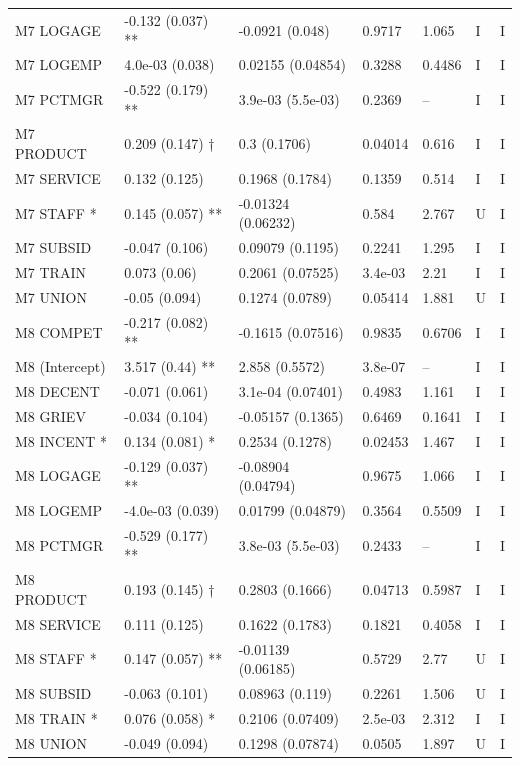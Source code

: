 {\begin{longtable}{@{}p{.245\linewidth}p{.17\linewidth}p{.17\linewidth}p{.085\linewidth}p{.060\linewidth}p{.08\linewidth}p{.07\linewidth}@{}}
M7 LOGAGE & -0.132 (0.037) ** & -0.0921 (0.048) & 0.9717 & 1.065 & I & I\\
M7 LOGEMP & 4.0e-03 (0.038) & 0.02155 (0.04854) & 0.3288 & 0.4486 & I & I\\
M7 PCTMGR & -0.522 (0.179) ** & 3.9e-03 (5.5e-03) & 0.2369 & -- & I & I\\
M7 PRODUCT & 0.209 (0.147) † & 0.3 (0.1706) & 0.04014 & 0.616 & I & I\\
M7 SERVICE & 0.132 (0.125) & 0.1968 (0.1784) & 0.1359 & 0.514 & I & I\\
M7 STAFF * & 0.145 (0.057) ** & -0.01324 (0.06232) & 0.584 & 2.767 & U & I\\
M7 SUBSID & -0.047 (0.106) & 0.09079 (0.1195) & 0.2241 & 1.295 & I & I\\
M7 TRAIN & 0.073 (0.06) & 0.2061 (0.07525) & 3.4e-03 & 2.21 & I & I\\
M7 UNION & -0.05 (0.094) & 0.1274 (0.0789) & 0.05414 & 1.881 & U & I\\
M8 COMPET & -0.217 (0.082) ** & -0.1615 (0.07516) & 0.9835 & 0.6706 & I & I\\
M8 (Intercept) & 3.517 (0.44) ** & 2.858 (0.5572) & 3.8e-07 & -- & I & I\\
M8 DECENT & -0.071 (0.061) & 3.1e-04 (0.07401) & 0.4983 & 1.161 & I & I\\
M8 GRIEV & -0.034 (0.104) & -0.05157 (0.1365) & 0.6469 & 0.1641 & I & I\\
M8 INCENT * & 0.134 (0.081) * & 0.2534 (0.1278) & 0.02453 & 1.467 & I & I\\
M8 LOGAGE & -0.129 (0.037) ** & -0.08904 (0.04794) & 0.9675 & 1.066 & I & I\\
M8 LOGEMP & -4.0e-03 (0.039) & 0.01799 (0.04879) & 0.3564 & 0.5509 & I & I\\
M8 PCTMGR & -0.529 (0.177) ** & 3.8e-03 (5.5e-03) & 0.2433 & -- & I & I\\
M8 PRODUCT & 0.193 (0.145) † & 0.2803 (0.1666) & 0.04713 & 0.5987 & I & I\\
M8 SERVICE & 0.111 (0.125) & 0.1622 (0.1783) & 0.1821 & 0.4058 & I & I\\
M8 STAFF * & 0.147 (0.057) ** & -0.01139 (0.06185) & 0.5729 & 2.77 & U & I\\
M8 SUBSID & -0.063 (0.101) & 0.08963 (0.119) & 0.2261 & 1.506 & U & I\\
M8 TRAIN * & 0.076 (0.058) * & 0.2106 (0.07409) & 2.5e-03 & 2.312 & I & I\\
M8 UNION & -0.049 (0.094) & 0.1298 (0.07874) & 0.0505 & 1.897 & U & I\\

\end{longtable}}

